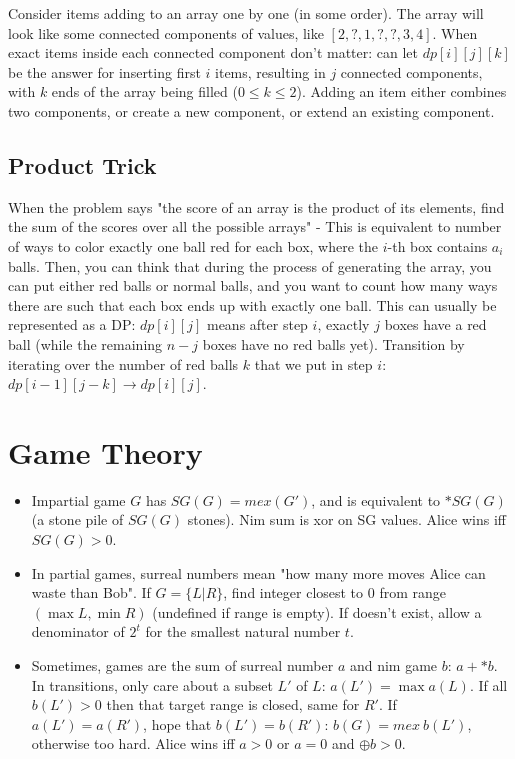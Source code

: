 		Consider items adding to an array one by one (in some order). The array will look like some connected components of values, like $[2, ?, 1, ?, ?, 3, 4]$. When exact items inside each connected component don't matter: can let $dp[i][j][k]$ be the answer for inserting first $i$ items, resulting in $j$ connected components, with $k$ ends of the array being filled ($0 \leq k \leq 2$). Adding an item either combines two components, or create a new component, or extend an existing component.

	\subsection{Product Trick}

		When the problem says "the score of an array is the product of its elements, find the sum of the scores over all the possible arrays" - This is equivalent to number of ways to color exactly one ball red for each box, where the $i$-th box contains $a_i$ balls. Then, you can think that during the process of generating the array, you can put either red balls or normal balls, and you want to count how many ways there are such that each box ends up with exactly one ball. This can usually be represented as a DP: $dp[i][j]$ means after step $i$, exactly $j$ boxes have a red ball (while the remaining $n-j$ boxes have no red balls yet). Transition by iterating over the number of red balls $k$ that we put in step $i$: $dp[i - 1][j - k] \to dp[i][j]$.

\clearpage

\section{Game Theory}
	\begin{itemize}
		\item Impartial game $G$ has $SG(G)=mex(G')$, and is equivalent to $*SG(G)$ (a stone pile of $SG(G)$ stones). Nim sum is xor on SG values. Alice wins iff $SG(G)>0$. 

		\item In partial games, surreal numbers mean "how many more moves Alice can waste than Bob". If $G=\{L|R\}$, find integer closest to $0$ from range $(\max L, \min R)$ (undefined if range is empty). If doesn't exist, allow a denominator of $2^t$ for the smallest natural number $t$.
	
		\item Sometimes, games are the sum of surreal number $a$ and nim game $b$: $a+*b$. In transitions, only care about a subset $L'$ of $L$: $a(L')=\max a(L)$. If all $b(L')>0$ then that target range is closed, same for $R'$. If $a(L')=a(R')$, hope that $b(L')=b(R')$: $b(G)=mex\ b(L')$, otherwise too hard. Alice wins iff $a>0$ or $a=0$ and $\oplus b>0$.
	\end{itemize}

